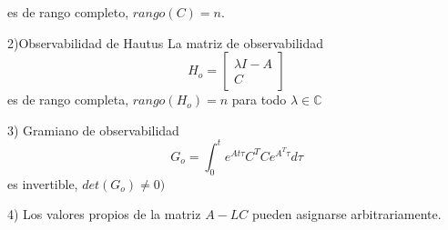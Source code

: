 es de rango completo, \( rango(C)=n \).

2)Observabilidad de Hautus
La matriz de observabilidad
\[
    H_{o} =
    \begin{bmatrix}
        \lambda I-A \\ 
        C
    \end{bmatrix}
\]
es de rango completa, \( rango(H_{o})=n \) para todo \( \lambda \in \mathbb{C} \)

3) Gramiano de observabilidad
\[
    G_{o} = \int_{0}^{t} e^{At\tau}C^{T}Ce^{A^{T}\tau}d\tau
\]
es invertible, \( det(G_{o}) \not= 0) \)

4) Los valores propios de la matriz \(A-LC\) pueden asignarse arbitrariamente.
